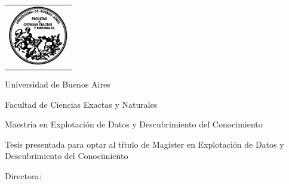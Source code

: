 \newcommand{\HRule}{\rule{\linewidth}{0.2mm}}
%
\thispagestyle{empty}

\begin{center}\leavevmode

\vspace{-2cm}

\begin{tabular}{l}
\includegraphics[width=2.6cm]{frontmatter/logofcen.pdf}
\end{tabular}


{\large \sc Universidad de Buenos Aires

Facultad de Ciencias Exactas y Naturales

Maestría en Explotación de Datos y Descubrimiento del Conocimiento}

\vspace{2.0cm}


\begin{huge}
\textbf{\tituloTesis}
\end{huge}

\vspace{2cm}

{\large Tesis presentada para optar al título de Magíster en Explotación de Datos y Descubrimiento del Conocimiento}

\vspace{2cm}

{\Large \autor}

\end{center}

\vfill

{\large

{Directora: \director}

\vspace{1cm}



\lugar
\vspace{1cm}

\fechapre

\vspace{1cm}
\fechadef

}

\newpage\thispagestyle{empty}
